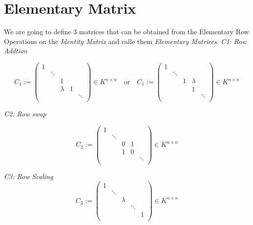 \newpage
\section{Elementary Matrix}

We are going to define 3 matrices that can be obtained from the Elementary Row
Operations on the \emph{Identity Matrix} and calle them \emph{Elementary Matrices}.
\newline
\emph{C1: Row Addtion}

\[
C_1 := 
\begin{pmatrix}
1      &        &        &        &        \\
       & \ddots &        &        &        \\
       &        & 1      &        &        \\
       &        & \lambda & 1     &        \\
       &        &        &        & \ddots \\
\end{pmatrix}
\in K^{n \times n}
\quad \text{or} \quad
C_1 := 
\begin{pmatrix}
1      &        &        &        &        \\
       & \ddots &        &        &        \\
       &        & 1      & \lambda &        \\
       &        &        & 1      &        \\
       &        &        &        & \ddots \\
\end{pmatrix}
\in K^{n \times n}
\]


\emph{C2: Row swap}

\[
C_2 := 
\begin{pmatrix}
1      &        &        &        &        \\
       & \ddots &        &        &        \\
       &        & 0      & 1      &        \\
       &        & 1      & 0      &        \\
       &        &        &        & \ddots \\
\end{pmatrix}
\in K^{n \times n}
\]


\emph{C3: Row Scaling}
\[
C_3 := 
\begin{pmatrix}
1      &        &        &        &        \\
       & \ddots &        &        &        \\
       &        & \lambda &       &        \\
       &        &        & \ddots &        \\
       &        &        &        & 1      \\
\end{pmatrix}
\in K^{n \times n}
\]

